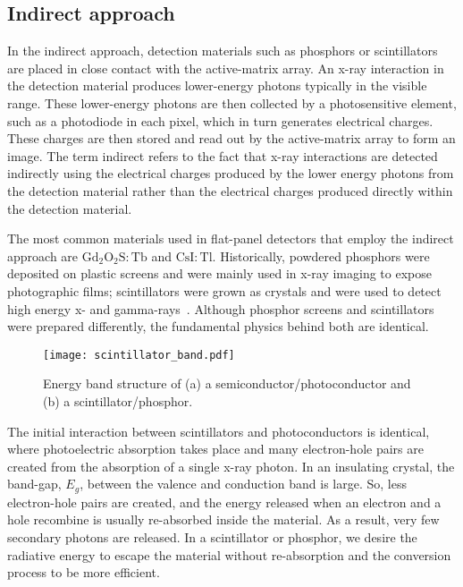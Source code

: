 \subsection{Indirect approach}
In the indirect approach, detection materials such as phosphors or scintillators are placed in close contact with the active-matrix array.  An x-ray interaction in the detection material produces lower-energy photons typically in the visible range.  These lower-energy photons are then collected by a photosensitive element, such as a photodiode in each pixel, which in turn generates electrical charges.  These charges are then stored and read out by the active-matrix array to form an image.  The term indirect refers to the fact that x-ray interactions are detected indirectly using the electrical charges produced by the lower energy photons from the detection material rather than the electrical charges produced directly within the detection material.  

The most common materials used in flat-panel detectors that employ the indirect approach are $\mathrm{Gd_2O_2S:Tb}$ and $\mathrm{CsI:Tl}$.  Historically, powdered phosphors were deposited on plastic screens and were mainly used in x-ray imaging to expose photographic films; scintillators were grown as crystals and were used to detect high energy x- and gamma-rays~\citep{Nikl2006}.  Although phosphor screens and scintillators were prepared differently, the fundamental physics behind both are identical.  

\begin{figure}[h]
\centering
\texttt{[image: scintillator\_band.pdf]}
\caption{Energy band structure of (a) a semiconductor/photoconductor and (b) a scintillator/phosphor.}
\label{fig:scintillator_band}
\end{figure}

The initial interaction between scintillators and photoconductors is identical, where photoelectric absorption takes place and many electron-hole pairs are created from the absorption of a single x-ray photon.  In an insulating crystal, the band-gap, $E_g$, between the valence and conduction band is large.  So, less electron-hole pairs are created, and the energy released when an electron and a hole recombine is usually re-absorbed inside the material.  As a result, very few secondary photons are released.  In a scintillator or phosphor, we desire the radiative energy to escape the material without re-absorption and the conversion process to be more efficient.

